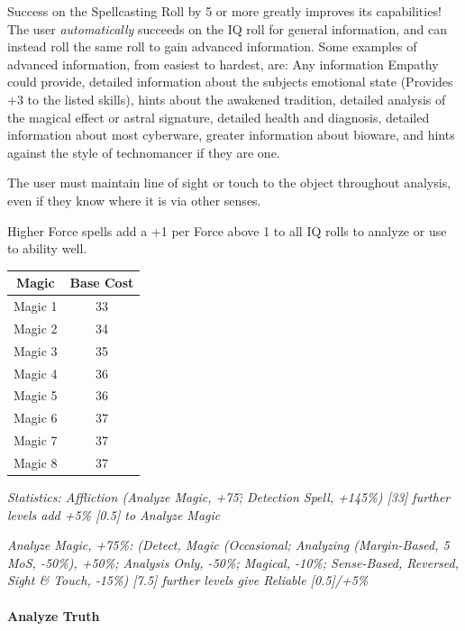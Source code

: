 \begin{multicols}{3}
	Success on the Spellcasting Roll by 5 or more greatly improves its capabilities! The user \textit{automatically} succeeds on the IQ roll for general information, and can instead roll the same roll to gain advanced information. Some examples of advanced information, from easiest to hardest, are: Any information Empathy could provide, detailed information about the subjects emotional state (Provides +3 to the listed skills), hints about the awakened tradition, detailed analysis of the magical effect or astral signature, detailed health and diagnosis, detailed information about most cyberware, greater information about bioware, and hints against the style of technomancer if they are one.
	
	The user must maintain line of sight or touch to the object throughout analysis, even if they know where it is via other senses.
	
	Higher Force spells add a +1 per Force above 1 to all IQ rolls to analyze or use to ability well.
	
	\begin{center}
		\begin{tabular}{|c|c|}
			\hline
			Magic & Base Cost \\
			\hline
			\hline
			Magic 1 & 33 \\
			Magic 2 & 34 \\
			Magic 3 & 35 \\
			Magic 4 & 36 \\
			Magic 5 & 36 \\
			Magic 6 & 37 \\
			Magic 7 & 37 \\
			Magic 8 & 37 \\
			\hline
		\end{tabular}
	\end{center}
	
	\textcolor{OliveGreen}{\textit{ Statistics: Affliction (Analyze Magic, +75\^; Detection Spell, +145\%) [33] further levels add +5\% [0.5] to Analyze Magic}}
	
	\textcolor{OliveGreen}{\textit{Analyze Magic, +75\%: (Detect, Magic (Occasional; Analyzing (Margin-Based, 5 MoS, -50\%), +50\%; Analysis Only, -50\%; Magical, -10\%; Sense-Based, Reversed, Sight \& Touch, -15\%) [7.5] further levels give Reliable [0.5]/+5\%}}
	
	\paragraph{Analyze Truth}
	

\end{multicols}
